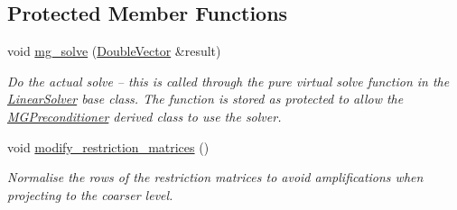 \subsection*{Protected Member Functions}
\begin{DoxyCompactItemize}
\item 
void \hyperlink{classoomph_1_1MGSolver_a70f1090e0673b8f9c4b87080adff0e2f}{mg\+\_\+solve} (\hyperlink{classoomph_1_1DoubleVector}{Double\+Vector} \&result)
\begin{DoxyCompactList}\small\item\em Do the actual solve -- this is called through the pure virtual solve function in the \hyperlink{classoomph_1_1LinearSolver}{Linear\+Solver} base class. The function is stored as protected to allow the \hyperlink{classoomph_1_1MGPreconditioner}{M\+G\+Preconditioner} derived class to use the solver. \end{DoxyCompactList}\item 
void \hyperlink{classoomph_1_1MGSolver_ad31f3a5daa8edec01ab20c92e5fcca54}{modify\+\_\+restriction\+\_\+matrices} ()
\begin{DoxyCompactList}\small\item\em Normalise the rows of the restriction matrices to avoid amplifications when projecting to the coarser level. \end{DoxyCompactList}\end{DoxyCompactItemize}
